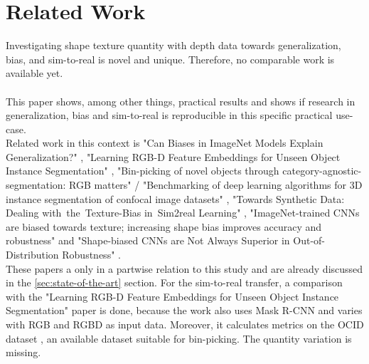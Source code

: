 	\section{Related Work}
	\label{sec:related-work}
		Investigating shape texture quantity with depth data towards generalization, bias, and sim-to-real is novel and unique. Therefore, no comparable work is available yet. \\
		\\
		This paper shows, among other things, practical results and shows if research in generalization, bias and sim-to-real is reproducible in this specific practical use-case.\\
		Related work in this context is "Can Biases in ImageNet Models Explain Generalization?" \cite{Gavrikov2024}, "Learning RGB-D Feature Embeddings for Unseen Object Instance Segmentation" \cite{Xiang2021}, "Bin-picking of novel objects through category-agnostic-segmentation: RGB matters" \cite{Raj2023} / "Benchmarking of deep learning algorithms for 3D instance segmentation of confocal image datasets" \cite{Kar2022}, "Towards Synthetic Data: Dealing with the Texture-Bias in Sim2real Learning" \cite{Tabak2023}, "ImageNet-trained CNNs are biased towards texture; increasing shape bias improves accuracy and robustness" \cite{Geirhos2022} and "Shape-biased CNNs are Not Always Superior in Out-of-Distribution Robustness" \cite{Qiu2024}.\\
		These papers a only in a partwise relation to this study and are already discussed in the \ref{sec:state-of-the-art} section.
		For the sim-to-real transfer, a comparison with the "Learning RGB-D Feature Embeddings for Unseen Object Instance Segmentation" \cite{Xiang2021} paper is done, because the work also uses Mask R-CNN \cite{Kaiming2017} and varies with RGB and RGBD as input data. Moreover, it calculates metrics on the OCID dataset \cite{Suchi2019}, an available dataset suitable for bin-picking. The quantity variation is missing.
	
	
